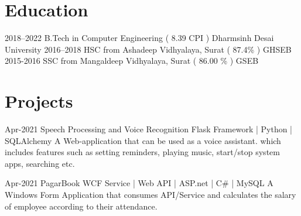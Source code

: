 \documentclass[]{cv-style}
\begin{document}
\section{Education}

\begin{entrylist}
\entry
{2018--2022}
{B.Tech {\normalfont in Computer Engineering ( 8.39 CPI )}}
{Dharmsinh Desai University}
{\vspace{-0.3cm}}
\entry
{2016--2018}
{HSC {\normalfont from Ashadeep Vidhyalaya, Surat ( 87.4\% )}}
{GHSEB}
{\vspace{-0.3cm}}
\entry
{2015-2016}
{SSC {\normalfont from Mangaldeep Vidhyalaya, Surat ( 86.00 \% )}}
{GSEB}
{}

\end{entrylist}


\section{Projects}

\begin{entrylist}
\entry
{Apr-2021}
{Speech Processing and Voice Recognition}
{Flask Framework | Python | SQLAlchemy}
{A Web-application that can be used as a voice assistant. which includes features such as setting reminders, playing music, start/stop system apps, searching etc.}
{\vspace{-0.3cm}}
\end{entrylist}

\begin{entrylist}
\entry
{Apr-2021}
{PagarBook}
{WCF Service | Web API | ASP.net | C\# | MySQL }
{A Windows Form Application that consumes API/Service and calculates the salary of employee according to their attendance. }
{\vspace{-0.3cm}}

\end{entrylist}
\end{document}
